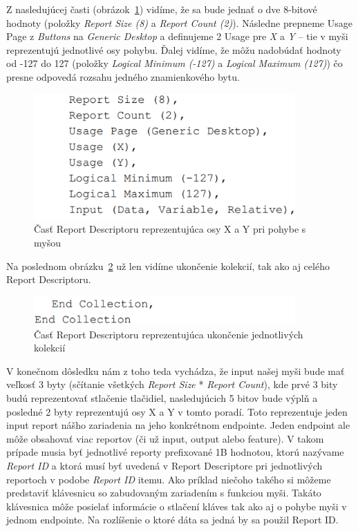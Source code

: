 Z nasledujúcej časti (obrázok~\ref{obr:kap3:report_desc_axis}) vidíme, že sa bude jednať o dve 8-bitové hodnoty (položky \textit{Report Size (8)} a \textit{Report Count (2)}). Následne prepneme Usage Page z \textit{Buttons} na \textit{Generic Desktop} a definujeme 2 Usage pre \textit{X} a \textit{Y} -- tie v myši reprezentujú jednotlivé osy pohybu. Ďalej vidíme, že môžu nadobúdať hodnoty od -127 do 127 (položky \textit{Logical Minimum (-127)} a \textit{Logical Maximum (127)}) čo presne odpovedá rozsahu jedného znamienkového bytu.

\begin{figure}[!htb]
	\centering
	\includegraphics[width=10cm]{img/kap03_report_desc_axis}
	\caption{Časť Report Descriptoru reprezentujúca osy X a Y pri pohybe s myšou}
	\label{obr:kap3:report_desc_axis}
\end{figure}

Na poslednom obrázku~\ref{obr:kap3:report_desc_end} už len vidíme ukončenie kolekcií, tak ako aj celého Report Descriptoru.

\begin{figure}[!htb]
	\centering
	\includegraphics[width=10cm]{img/kap03_report_desc_end}
	\caption{Časť Report Descriptoru reprezentujúca ukončenie jednotlivých kolekcií}
	\label{obr:kap3:report_desc_end}
\end{figure}

V konečnom dôsledku nám z toho teda vychádza, že input našej myši bude mať veľkosť 3 byty (sčítanie všetkých \textit{Report Size} * \textit{Report Count}), kde prvé 3 bity budú reprezentovať stlačenie tlačidiel, nasledujúcich 5 bitov bude výplň a posledné 2 byty reprezentujú osy X a Y v tomto poradí. Toto reprezentuje jeden input report nášho zariadenia na jeho konkrétnom endpointe. Jeden endpoint ale môže obsahovať viac reportov (či už input, output alebo feature). V takom prípade musia byť jednotlivé reporty prefixované 1B hodnotou, ktorú nazývame \textit{Report ID} a ktorá musí byť uvedená v Report Descriptore pri jednotlivých reportoch v podobe \textit{Report ID} itemu. Ako príklad niečoho takého si môžeme predstaviť klávesnicu so zabudovaným zariadením s funkciou myši. Takáto klávesnica môže posielať informácie o stlačení kláves tak ako aj o pohybe myši v jednom endpointe. Na rozlíšenie o ktoré dáta sa jedná by sa použil Report ID.

